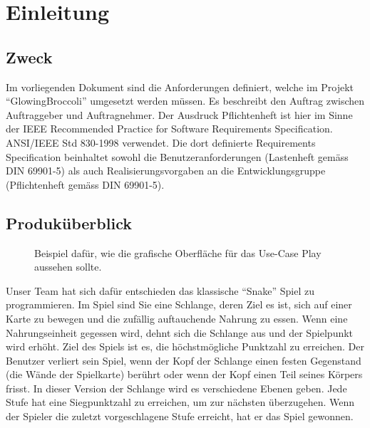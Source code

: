 \documentclass[a4paper, twosided, 11pt]{scrartcl}
\begin{document}
\clearpage
\tableofcontents
\listoffigures
\listoftables

\clearpage

\section{Einleitung}
\subsection{Zweck}

Im vorliegenden Dokument sind die Anforderungen definiert, welche im Projekt
``GlowingBroccoli'' umgesetzt werden müssen. Es beschreibt den Auftrag zwischen
Auftraggeber und Auftragnehmer. Der Ausdruck Pflichtenheft ist hier im Sinne
der IEEE Recommended Practice for Software Requirements Specification.
ANSI/IEEE Std 830-1998 verwendet. Die dort definierte Requirements
Specification beinhaltet sowohl die Benutzeranforderungen (Lastenheft gemäss
DIN 69901-5) als auch Realisierungsvorgaben an die Entwicklungsgruppe
(Pflichtenheft gemäss DIN 69901-5).

\subsection{Produk\"uberblick}
\begin{figure}[H]
  \centering
  
  \caption[Beispiel f\"ur grafische Oberfl\"ache in Use Case Play]{Beispiel dafür, wie die grafische Oberfläche f\"ur das Use-Case Play aussehen sollte.}
\end{figure}

Unser Team hat sich dafür entschieden das klassische ``Snake'' Spiel zu
programmieren.  Im Spiel sind Sie eine Schlange, deren Ziel es ist, sich auf
einer Karte zu bewegen und die zufällig auftauchende Nahrung zu essen. Wenn
eine Nahrungseinheit gegessen wird, dehnt sich die Schlange aus und der
Spielpunkt wird erhöht.  Ziel des Spiels ist es, die höchstmögliche Punktzahl
zu erreichen.  Der Benutzer verliert sein Spiel, wenn der Kopf der Schlange
einen festen Gegenstand (die Wände der Spielkarte) berührt oder wenn der Kopf
einen Teil seines Körpers frisst.  In dieser Version der Schlange wird es
verschiedene Ebenen geben. Jede Stufe hat eine Siegpunktzahl zu erreichen, um
zur nächsten überzugehen. Wenn der Spieler die zuletzt vorgeschlagene Stufe
erreicht, hat er das Spiel gewonnen.


\end{document}

